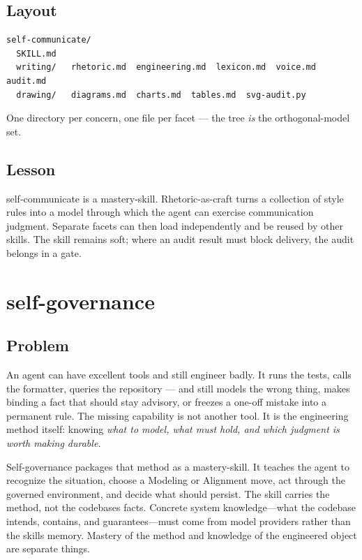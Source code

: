 \subsection{Layout}\label{heading:layout}

\begin{verbatim}
self-communicate/
  SKILL.md
  writing/   rhetoric.md  engineering.md  lexicon.md  voice.md  audit.md
  drawing/   diagrams.md  charts.md  tables.md  svg-audit.py
\end{verbatim}

One directory per concern, one file per facet --- the tree \emph{is} the orthogonal-model set.

\subsection{Lesson}\label{heading:lesson}

self-communicate is a mastery-skill. Rhetoric-as-craft turns a collection of style rules into a model through which the agent can exercise communication judgment. Separate facets can then load independently and be reused by other skills. The skill remains soft; where an audit result must block delivery, the audit belongs in a gate.

\section{self-governance}\label{heading:self-governance}

\subsection{Problem}\label{heading:problem-1}

An agent can have excellent tools and still engineer badly. It runs the tests, calls the formatter, queries the repository --- and still models the wrong thing, makes binding a fact that should stay advisory, or freezes a one-off mistake into a permanent rule. The missing capability is not another tool. It is the engineering method itself: knowing \emph{what to model, what must hold, and which judgment is worth making durable.}

Self-governance packages that method as a mastery-skill. It teaches the agent to recognize the situation, choose a Modeling or Alignment move, act through the governed environment, and decide what should persist. The skill carries the method, not the codebase\textquotesingle s facts. Concrete system knowledge---what the codebase intends, contains, and guarantees---must come from model providers rather than the skill\textquotesingle s memory. Mastery of the method and knowledge of the engineered object are separate things.

